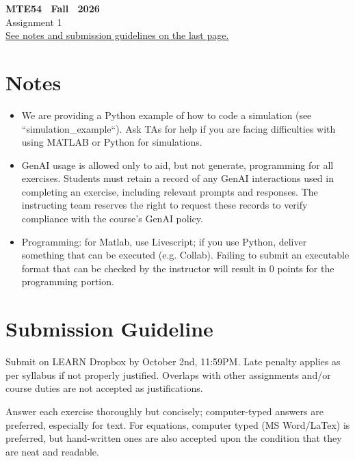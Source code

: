 \documentclass{article}
\begin{document}
\begin{center}
     \textbf{MTE54 \ Fall \ 2026}\\
     Assignment 1 \\ \underline{See notes and submission guidelines on the last page.}
\end{center}


\newpage


%
\newpage


\section*{Notes}

\begin{itemize}
    \item We are providing a Python example of how to code a simulation (see ``simulation\_example``). Ask TAs for help if you are facing difficulties with using MATLAB or Python for simulations.
    \item GenAI usage is allowed only to aid, but not generate, programming for all exercises. Students must retain a record of any GenAI interactions used in completing an exercise, including relevant prompts and responses. The instructing team reserves the right to request these records to verify compliance with the course's GenAI policy.
    \item Programming: for Matlab, use Livescript; if you use Python, deliver something that can be executed (e.g. Collab). Failing to submit an executable format that can be checked by the instructor will result in 0 points for the programming portion.
\end{itemize}


\section*{Submission Guideline}

Submit on LEARN Dropbox by October 2nd, 11:59PM. Late penalty applies as per syllabus if not properly justified. Overlaps with other assignments and/or course duties are not accepted as justifications. 

Answer each exercise thoroughly but concisely; computer-typed answers are preferred, especially for text. For equations, computer typed (MS Word/LaTex) is preferred, but hand-written ones are also accepted upon the condition that they are neat and readable. 
\end{document}
